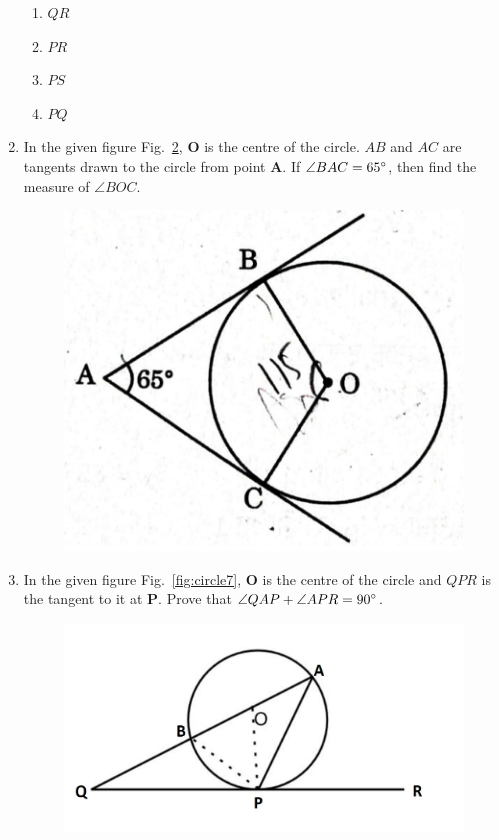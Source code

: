\documentclass{article}
\let\vec\mathbf
\newcommand\figref{Fig.~\ref}
\begin{document}
\begin{enumerate}
\begin{figure}[H]
			\caption{}
			\label{fig:circle5}
		\end{figure}
		\begin{enumerate}
			\item $ QR $
			\item $ PR $
			\item $ PS $
			\item $ PQ $
		\end{enumerate}
	\item In the given figure \figref{fig:circle6}, $ \vec{O} $ is the centre of the circle. $ AB $ and $ AC $ are tangents drawn to the circle from point $ \vec{A} $. If $ \angle{BAC} = 65{\degree} $, then find the measure of $ \angle{BOC} $.
		\begin{figure}[H]
			\centering
			\includegraphics[width=\columnwidth]{fig7.jpg}
			\caption{}
			\label{fig:circle6}
		\end{figure}
	\item In the given figure \figref{fig:circle7}, $ \vec{O} $ is the centre of the circle and $ QPR $ is the tangent to it at $ \vec{P} $. Prove that $ \angle{QAP} + \angle{APR} = 90{\degree} $.
		\begin{figure}[H]
			\centering
			\includegraphics[width=\columnwidth]{fig8.jpg}

\end{figure}
\end{enumerate}
\end{document}
